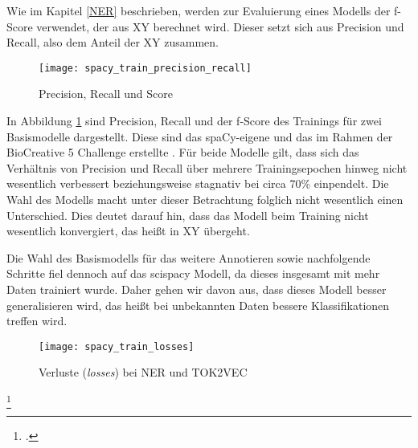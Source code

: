 Wie im Kapitel \ref{NER} beschrieben, werden zur Evaluierung eines Modells der f-Score verwendet, der aus XY berechnet wird. Dieser setzt sich aus Precision und Recall, also dem Anteil der XY zusammen.

\begin{figure}[H]
    \centering
    \caption[]{Precision, Recall und Score}
	\label{fig:TrainPrecisionRecall}
    \texttt{[image: spacy\_train\_precision\_recall]}
\end{figure}
In Abbildung \ref{fig:TrainPrecisionRecall} sind Precision, Recall und der f-Score des Trainings für zwei Basismodelle dargestellt. Diese sind das spaCy-eigene \grqq{} und das im Rahmen der BioCreative 5 Challenge erstellte \grqq. Für beide Modelle gilt, dass sich das Verhältnis von Precision und Recall über mehrere Trainingsepochen hinweg nicht wesentlich verbessert beziehungsweise stagnativ bei circa 70\% einpendelt. Die Wahl des Modells macht unter dieser Betrachtung folglich nicht wesentlich einen Unterschied. Dies deutet darauf hin, dass das Modell beim Training nicht wesentlich konvergiert, das heißt in XY übergeht.

Die Wahl des Basismodells für das weitere Annotieren sowie nachfolgende Schritte fiel dennoch auf das scispacy Modell, da dieses insgesamt mit mehr Daten trainiert wurde. Daher gehen wir davon aus, dass dieses Modell besser generalisieren wird, das heißt bei unbekannten Daten bessere Klassifikationen treffen wird.
\begin{figure}[H]
    \centering
    \caption[]{Verluste (\textit{losses}) bei \ac{NER} und TOK2VEC}
	\label{fig:TrainLosses}
    \texttt{[image: spacy\_train\_losses]}
\end{figure}
\footcite[]{tsai2006}

